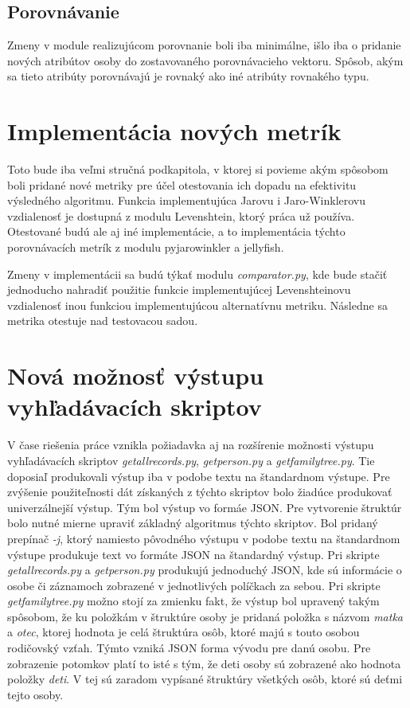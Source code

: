 \subsection{Porovnávanie}

Zmeny v module realizujúcom porovnanie boli iba minimálne, išlo iba o pridanie nových atribútov osoby do zostavovaného porovnávacieho vektoru. Spôsob, akým sa tieto atribúty porovnávajú je rovnaký ako iné atribúty rovnakého typu.

\section{Implementácia nových metrík}

Toto bude iba veľmi stručná podkapitola, v ktorej si povieme akým spôsobom boli pridané nové metriky pre účel otestovania ich dopadu na efektivitu výsledného algoritmu. Funkcia implementujúca Jarovu i Jaro-Winklerovu vzdialenosť je dostupná z modulu Levenshtein, ktorý práca už používa. Otestované budú ale aj iné implementácie, a to implementácia týchto porovnávacích metrík z modulu pyjarowinkler a jellyfish.

Zmeny v implementácii sa budú týkať modulu \textit{comparator.py}, kde bude stačiť jednoducho nahradiť použitie funkcie implementujúcej Levenshteinovu vzdialenosť inou funkciou implementujúcou alternatívnu metriku. Následne sa metrika otestuje nad testovacou sadou.

\section{Nová možnosť výstupu vyhľadávacích skriptov}

V čase riešenia práce vznikla požiadavka aj na rozšírenie možnosti výstupu vyhľadávacích skriptov \textit{get\textunderscore all\textunderscore records.py}, \textit{get\textunderscore person.py} a \textit{get\textunderscore family\textunderscore tree.py}. Tie doposiaľ produkovali výstup iba v podobe textu na štandardnom výstupe. Pre zvýšenie použiteľnosti dát získaných z týchto skriptov bolo žiadúce produkovať univerzálnejší výstup. Tým bol výstup vo formáe JSON. Pre vytvorenie štruktúr bolo nutné mierne upraviť základný algoritmus týchto skriptov. Bol pridaný prepínač \textit{-j}, ktorý namiesto pôvodného výstupu v podobe textu na štandardnom výstupe produkuje text vo formáte JSON na štandardný výstup. Pri skripte \textit{get\textunderscore all\textunderscore records.py} a \textit{get\textunderscore person.py} produkujú jednoduchý JSON, kde sú informácie o osobe či záznamoch zobrazené v jednotlivých políčkach za sebou. Pri skripte \textit{get\textunderscore family\textunderscore tree.py} možno stojí za zmienku fakt, že výstup bol upravený takým spôsobom, že ku položkám v štruktúre osoby je pridaná položka s názvom \textit{matka} a \textit{otec}, ktorej hodnota je celá štruktúra osôb, ktoré majú s touto osobou rodičovský vzťah. Týmto vzniká JSON forma vývodu pre danú osobu. Pre zobrazenie potomkov platí to isté s tým, že deti osoby sú zobrazené ako hodnota položky \textit{deti}. V tej sú zaradom vypísané štruktúry všetkých osôb, ktoré sú deťmi tejto osoby.

